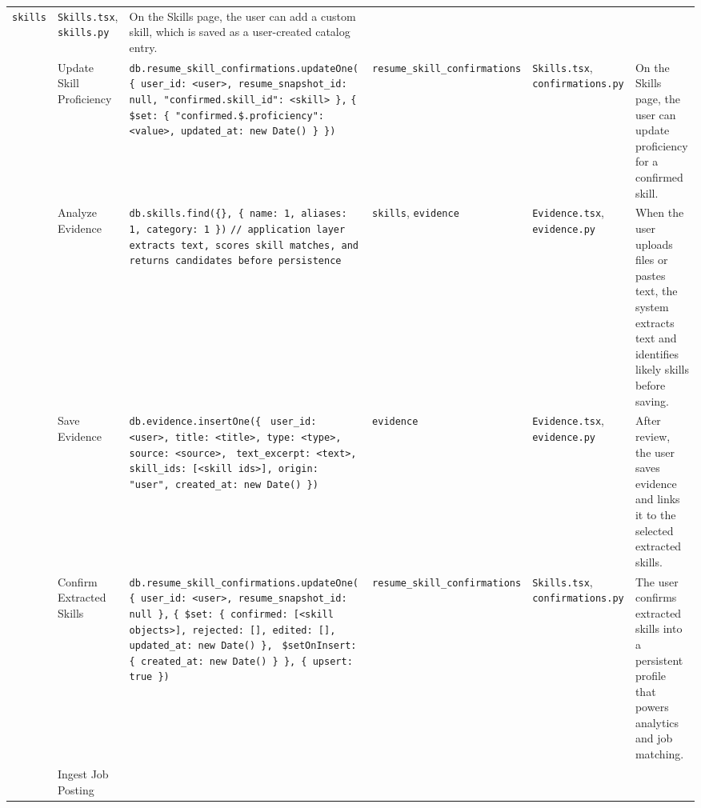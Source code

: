 \documentclass[11pt]{article}
\begin{document}
\begin{landscape}
\begin{longtable}{@{}p{0.28in}p{1.15in}p{3.3in}p{1.25in}p{1.35in}p{1.9in}@{}}
\texttt{skills} &
\texttt{Skills.tsx}, \texttt{skills.py} &
On the Skills page, the user can add a custom skill, which is saved as a user-created catalog entry. \\
\addlinespace
4 &
Update Skill Proficiency &
\texttt{db.resume\_skill\_confirmations.updateOne(} \newline
\texttt{\{ user\_id: <user>, resume\_snapshot\_id: null, "confirmed.skill\_id": <skill> \},} \newline
\texttt{\{ \$set: \{ "confirmed.\$.proficiency": <value>, updated\_at: new Date() \} \})} &
\texttt{resume\_skill\_confirmations} &
\texttt{Skills.tsx}, \texttt{confirmations.py} &
On the Skills page, the user can update proficiency for a confirmed skill. \\
\addlinespace
5 &
Analyze Evidence &
\texttt{db.skills.find(\{\}, \{ name: 1, aliases: 1, category: 1 \})} \newline
\texttt{// application layer extracts text, scores skill matches, and returns candidates before persistence} &
\texttt{skills}, \texttt{evidence} &
\texttt{Evidence.tsx}, \texttt{evidence.py} &
When the user uploads files or pastes text, the system extracts text and identifies likely skills before saving. \\
\addlinespace
6 &
Save Evidence &
\texttt{db.evidence.insertOne(\{} \newline
\texttt{ user\_id: <user>, title: <title>, type: <type>, source: <source>,} \newline
\texttt{ text\_excerpt: <text>, skill\_ids: [<skill ids>], origin: "user", created\_at: new Date() \})} &
\texttt{evidence} &
\texttt{Evidence.tsx}, \texttt{evidence.py} &
After review, the user saves evidence and links it to the selected extracted skills. \\
\addlinespace
7 &
Confirm Extracted Skills &
\texttt{db.resume\_skill\_confirmations.updateOne(} \newline
\texttt{\{ user\_id: <user>, resume\_snapshot\_id: null \},} \newline
\texttt{\{ \$set: \{ confirmed: [<skill objects>], rejected: [], edited: [], updated\_at: new Date() \},} \newline
\texttt{  \$setOnInsert: \{ created\_at: new Date() \} \}, \{ upsert: true \})} &
\texttt{resume\_skill\_confirmations} &
\texttt{Skills.tsx}, \texttt{confirmations.py} &
The user confirms extracted skills into a persistent profile that powers analytics and job matching. \\
\addlinespace
8 &
Ingest Job Posting &

\end{longtable}
\end{landscape}
\end{document}
